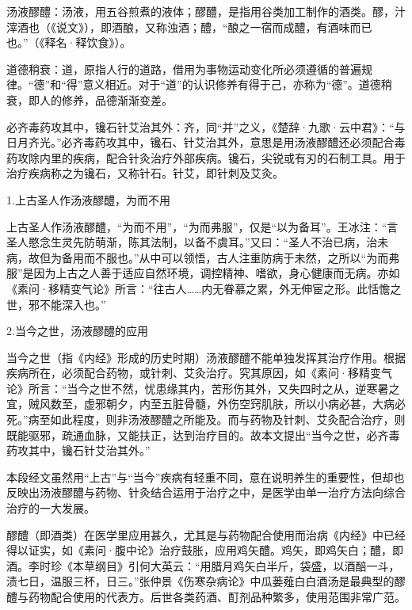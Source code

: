 \documentclass[draft,12pt]{ctexbook}
\begin{document}

\begin{jiaozhu}
  \item 汤液醪醴：汤液，用五谷煎煮的液体；醪醴，是指用谷类加工制作的酒类。醪，汁滓酒也（《说文》），即酒酿，又称浊酒；醴，“酿之一宿而成醴，有酒味而已也。”（《释名·释饮食》）。
  \item 道德稍衰：道，原指人行的道路，借用为事物运动变化所必须遵循的普遍规律。“德”和“得”意义相近。对于“道”的认识修养有得于己，亦称为“德”。道德稍衰，即人的修养，品德渐渐变差。
  \item 必齐毒药攻其中，镵石针艾治其外：齐，同“并”之义，《楚辞·九歌·云中君》：“与日月齐光。”必齐毒药攻其中，镵石、针艾治其外，意思是用汤液醪醴还必须配合毒药攻除内里的疾病，配合针灸治疗外部疾病。镵石，尖锐或有刃的石制工具。用于治疗疾病称之为镵石，又称针石。针艾，即针刺及艾灸。
\end{jiaozhu}


1.上古圣人作汤液醪醴，为而不用

上古圣人作汤液醪醴，“为而不用”，“为而弗服”，仅是“以为备耳”。王冰注：“言圣人愍念生灵先防萌渐，陈其法制，以备不虞耳。”又曰：“圣人不治已病，治未病，故但为备用而不服也。”从中可以领悟，古人注重防病于未然，之所以“为而弗服”是因为上古之人善于适应自然环境，调控精神、嗜欲，身心健康而无病。亦如《素问·移精变气论》所言：“往古人……内无眷慕之累，外无伸宦之形。此恬憺之世，邪不能深入也。”

2.当今之世，汤液醪醴的应用

当今之世（指《内经》形成的历史时期）汤液醪醴不能单独发挥其治疗作用。根据疾病所在，必须配合药物，或针刺、艾灸治疗。究其原因，如《素问·移精变气论》所言：“当今之世不然，忧患缘其内，苦形伤其外，又失四时之从，逆寒暑之宜，贼风数至，虚邪朝夕，内至五脏骨髓，外伤空窍肌肤，所以小病必甚，大病必死。”病至如此程度，则非汤液醪醴之所能及。而与药物及针刺、艾灸配合治疗，则既能驱邪，疏通血脉，又能扶正，达到治疗目的。故本文提出“当今之世，必齐毒药攻其中，镵石针艾治其外。”

本段经文虽然用“上古”与“当今”疾病有轻重不同，意在说明养生的重要性，但却也反映出汤液醪醴与药物、针灸结合运用于治疗之中，是医学由单一治疗方法向综合治疗的一大发展。



醪醴（即酒类）在医学里应用甚久，尤其是与药物配合使用而治病《内经》中已经得以证实，如《素问·腹中论》治疗鼓胀，应用鸡矢醴。鸡矢，即鸡矢白；醴，即酒。李时珍《本草纲目》引何大英云：“用腊月鸡矢白半斤，袋盛，以酒醅一斗，渍七日，温服三杯，日三。”张仲景《伤寒杂病论》中瓜蒌薤白白酒汤是最典型的醪醴与药物配合使用的代表方。后世各类药酒、酊剂品种繁多，使用范围非常广范。
\end{document}

